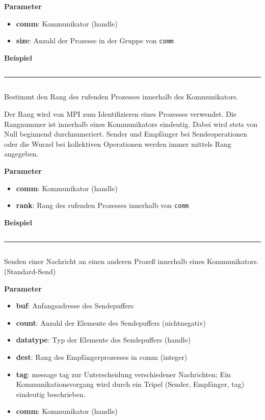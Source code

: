 \textbf{Parameter}
\begin{itemize}
    \item \textbf{comm}: Kommunikator (handle)
    \item \textbf{size}: Anzahl der Prozesse in der Gruppe von \texttt{comm}
\end{itemize}

\textbf{Beispiel}
\inputminted[numbersep=5pt, tabsize=4]{c}{scripts/mpi/comm-size-example.c}
\goodbreak
\rule{\textwidth}{0.4pt}%
\inputminted[numbersep=5pt, tabsize=4]{c}{scripts/mpi/comm-rank.c}
Bestimmt den Rang des rufenden Prozesses innerhalb des Kommunikators.

Der Rang wird von MPI zum Identifizieren eines Prozesses verwendet. Die Rangnummer ist innerhalb eines Kommunikators eindeutig. Dabei wird stets von Null beginnend durchnumeriert. Sender und Empfänger bei Sendeoperationen oder die Wurzel bei kollektiven Operationen werden immer mittels Rang angegeben.

\textbf{Parameter}
\begin{itemize}
    \item \textbf{comm}: Kommunikator (handle)
    \item \textbf{rank}: Rang des rufenden Prozesses innerhalb von \texttt{comm}
\end{itemize}

\textbf{Beispiel}
\inputminted[numbersep=5pt, tabsize=4]{c}{scripts/mpi/comm-rank-example.c}
\goodbreak
\rule{\textwidth}{0.4pt}%
\inputminted[numbersep=5pt, tabsize=4]{c}{scripts/mpi/mpi-send.c}
Senden einer Nachricht an einen anderen Prozeß innerhalb eines Kommunikators. (Standard-Send)

\textbf{Parameter}
\begin{itemize}
    \item \textbf{buf}: Anfangsadresse des Sendepuffers 
    \item \textbf{count}: Anzahl der Elemente des Sendepuffers (nichtnegativ) 
    \item \textbf{datatype}: Typ der Elemente des Sendepuffers (handle)
    \item \textbf{dest}: Rang des Empfängerprozesses in comm (integer)
    \item \textbf{tag}: message tag zur Unterscheidung verschiedener Nachrichten; 
Ein Kommunikationsvorgang wird durch ein Tripel (Sender, Empfänger, tag) eindeutig beschrieben. 
    \item \textbf{comm}: Kommunikator (handle)
\end{itemize}

